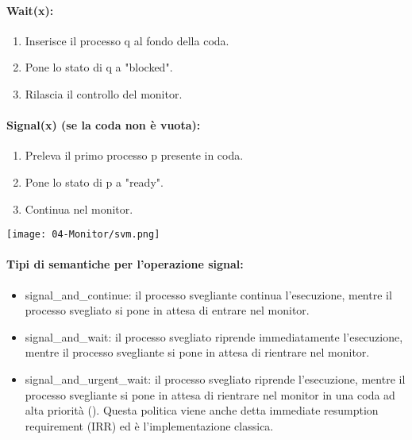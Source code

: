 \paragraph{Wait(x):}

\begin{enumerate}
	\item Inserisce il processo q al fondo della coda.
	\item Pone lo stato di q a "blocked".
	\item Rilascia il controllo del monitor.
\end{enumerate}

\paragraph{Signal(x) (se la coda non è vuota):}

\begin{enumerate}
	\item Preleva il primo processo p presente in coda.
	\item Pone lo stato di p a "ready".
	\item Continua nel monitor.
\end{enumerate}

\begin{center}
	\texttt{[image: 04-Monitor/svm.png]}
\end{center}

\paragraph{Tipi di semantiche per l'operazione signal:}

\begin{itemize}
	\item signal\_and\_continue: il processo svegliante continua l'esecuzione, mentre il processo svegliato si pone in attesa di entrare nel monitor.
	\item signal\_and\_wait: il processo svegliato riprende immediatamente
	      l’esecuzione, mentre il processo svegliante si pone in attesa di rientrare
	      nel monitor.
	\item signal\_and\_urgent\_wait: il processo svegliato riprende l’esecuzione,
	      mentre il processo svegliante si pone in attesa di rientrare nel monitor
	      in una coda ad alta priorità (). Questa politica viene anche
	      detta immediate resumption requirement (IRR) ed è l’implementazione
	      classica.
\end{itemize}

